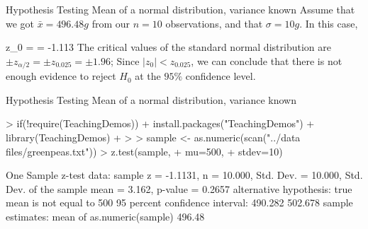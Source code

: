 \documentclass[t]{beamer}
\begin{document}
\begin{ftst}
{Hypothesis Testing}
{Mean of a normal distribution, variance known}
Assume that we got $\bar{x} = 496.48 g$ from our $n=10$ observations, and that $\sigma = 10g$. In this case,

\beqs 
z_0 =  = -1.113
\eqs
\vhalf
The critical values of the standard normal distribution are $\pm z_{\alpha/2} = \pm z_{0.025} = \pm 1.96$;
\vone
Since $|z_0|<z_{0.025}$, we can conclude that there is not enough evidence to reject $H_0$ at the $95\%$ confidence level.
\end{ftst}


\begin{ftstf}
{Hypothesis Testing}
{Mean of a normal distribution, variance known}

\begin{rcode}
> if(!require(TeachingDemos)){
+ 	install.packages("TeachingDemos")
+ 	library(TeachingDemos)
+ }
> 
> sample <- as.numeric(scan("../data files/greenpeas.txt"))
> z.test(sample,
+        mu=500,
+        stdev=10)

One Sample z-test
data:  sample
z = -1.1131, n = 10.000, Std. Dev. = 10.000, 
Std. Dev. of the sample mean = 3.162, 
p-value = 0.2657
alternative hypothesis: true mean is not equal to 500
95 percent confidence interval:
 490.282 502.678
sample estimates:
mean of as.numeric(sample) 
                    496.48 
\end{rcode}
\end{ftstf}

\end{document}
